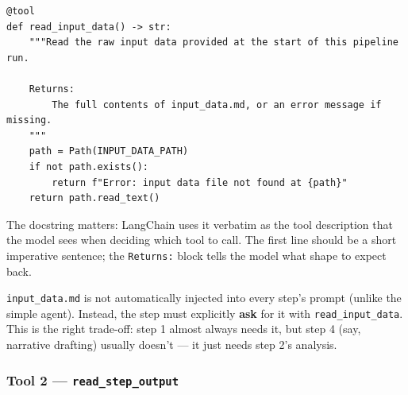 \documentclass[12pt, a4paper]{article}
\begin{document}
\begin{lstlisting}[style=pythonstyle]
@tool
def read_input_data() -> str:
    """Read the raw input data provided at the start of this pipeline run.

    Returns:
        The full contents of input_data.md, or an error message if missing.
    """
    path = Path(INPUT_DATA_PATH)
    if not path.exists():
        return f"Error: input data file not found at {path}"
    return path.read_text()
\end{lstlisting}

The docstring matters: LangChain uses it verbatim as the tool description that the model sees when deciding which tool to call. The first line should be a short imperative sentence; the \texttt{Returns:} block tells the model what shape to expect back.

\texttt{input\_data.md} is not automatically injected into every step's prompt (unlike the simple agent). Instead, the step must explicitly \textbf{ask} for it with \texttt{read\_input\_data}. This is the right trade-off: step 1 almost always needs it, but step 4 (say, narrative drafting) usually doesn't — it just needs step 2's analysis.

\subsubsection{Tool 2 — \texttt{read\_step\_output}}
\end{document}
